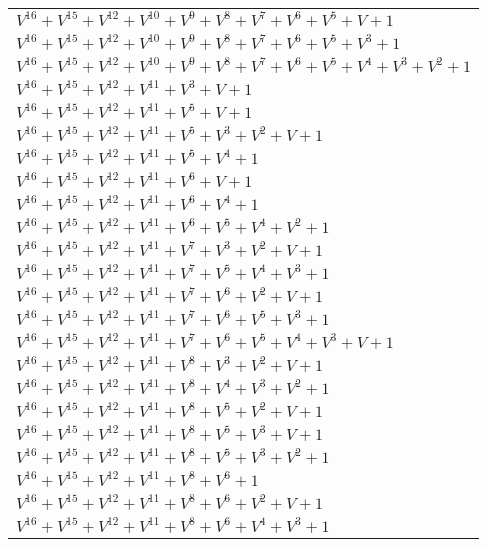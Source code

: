 \documentclass[12pt]{article}
\begin{document}
\begin{adjustwidth}{-4cm}{}
\begin{center}
\begin{longtable}{|l|}
$V^{16}  +V^{15}  +V^{12}  +V^{10}  +V^{9}  +V^{8}  +V^{7}  +V^{6}  +V^{5}  + V + 1$ \\
$V^{16}  +V^{15}  +V^{12}  +V^{10}  +V^{9}  +V^{8}  +V^{7}  +V^{6}  +V^{5}  +V^{3}  + 1$ \\
$V^{16}  +V^{15}  +V^{12}  +V^{10}  +V^{9}  +V^{8}  +V^{7}  +V^{6}  +V^{5}  +V^{4}  +V^{3}  +V^{2}  + 1$ \\
$V^{16}  +V^{15}  +V^{12}  +V^{11}  +V^{3}  + V + 1$ \\
$V^{16}  +V^{15}  +V^{12}  +V^{11}  +V^{5}  + V + 1$ \\
$V^{16}  +V^{15}  +V^{12}  +V^{11}  +V^{5}  +V^{3}  +V^{2}  + V + 1$ \\
$V^{16}  +V^{15}  +V^{12}  +V^{11}  +V^{5}  +V^{4}  + 1$ \\
$V^{16}  +V^{15}  +V^{12}  +V^{11}  +V^{6}  + V + 1$ \\
$V^{16}  +V^{15}  +V^{12}  +V^{11}  +V^{6}  +V^{4}  + 1$ \\
$V^{16}  +V^{15}  +V^{12}  +V^{11}  +V^{6}  +V^{5}  +V^{4}  +V^{2}  + 1$ \\
$V^{16}  +V^{15}  +V^{12}  +V^{11}  +V^{7}  +V^{3}  +V^{2}  + V + 1$ \\
$V^{16}  +V^{15}  +V^{12}  +V^{11}  +V^{7}  +V^{5}  +V^{4}  +V^{3}  + 1$ \\
$V^{16}  +V^{15}  +V^{12}  +V^{11}  +V^{7}  +V^{6}  +V^{2}  + V + 1$ \\
$V^{16}  +V^{15}  +V^{12}  +V^{11}  +V^{7}  +V^{6}  +V^{5}  +V^{3}  + 1$ \\
$V^{16}  +V^{15}  +V^{12}  +V^{11}  +V^{7}  +V^{6}  +V^{5}  +V^{4}  +V^{3}  + V + 1$ \\
$V^{16}  +V^{15}  +V^{12}  +V^{11}  +V^{8}  +V^{3}  +V^{2}  + V + 1$ \\
$V^{16}  +V^{15}  +V^{12}  +V^{11}  +V^{8}  +V^{4}  +V^{3}  +V^{2}  + 1$ \\
$V^{16}  +V^{15}  +V^{12}  +V^{11}  +V^{8}  +V^{5}  +V^{2}  + V + 1$ \\
$V^{16}  +V^{15}  +V^{12}  +V^{11}  +V^{8}  +V^{5}  +V^{3}  + V + 1$ \\
$V^{16}  +V^{15}  +V^{12}  +V^{11}  +V^{8}  +V^{5}  +V^{3}  +V^{2}  + 1$ \\
$V^{16}  +V^{15}  +V^{12}  +V^{11}  +V^{8}  +V^{6}  + 1$ \\
$V^{16}  +V^{15}  +V^{12}  +V^{11}  +V^{8}  +V^{6}  +V^{2}  + V + 1$ \\
$V^{16}  +V^{15}  +V^{12}  +V^{11}  +V^{8}  +V^{6}  +V^{4}  +V^{3}  + 1$ \\

\end{longtable}
\end{center}
\end{adjustwidth}
\end{document}
